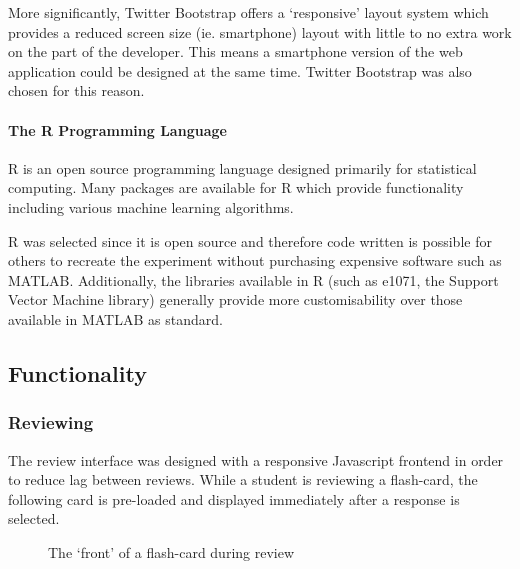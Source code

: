More significantly, Twitter Bootstrap offers a `responsive' layout 
system which provides a reduced screen size (ie. smartphone) layout
 with little to no extra work on the part of the developer. This 
 means a smartphone version of the web application could be designed
  at the same time. Twitter Bootstrap was also chosen for this reason.
  
\paragraph{The R Programming Language}
R is an open source programming language designed primarily for statistical computing.
Many packages are available for R which provide functionality including various
machine learning algorithms.

R was selected since it is open source and therefore code written is possible for others to recreate
the experiment without purchasing expensive software such as MATLAB. Additionally, the libraries
available in R (such as e1071, the Support Vector Machine library) generally provide more customisability
over those available in MATLAB as standard.

\subsection{Functionality}
\subsubsection{Reviewing}
The review interface was designed with a responsive Javascript frontend in order
to reduce lag between reviews. While a student is reviewing a flash-card, the following
card is pre-loaded and displayed immediately after a response is selected.
\begin{figure}
\caption{The `front' of a flash-card during review}
\label{fig_review_front}
\end{figure}

